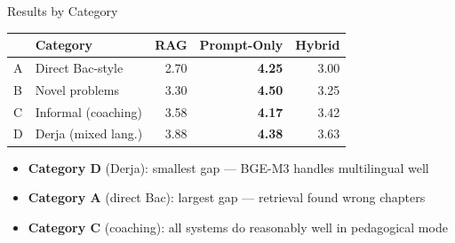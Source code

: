 \documentclass[aspectratio=169, 11pt]{beamer}
\begin{document}
\begin{frame}{Results by Category}

\begin{center}
\begin{tabular}{llrrr}
\toprule
& \textbf{Category} & \textbf{RAG} & \textbf{Prompt-Only} & \textbf{Hybrid} \\
\midrule
A & Direct Bac-style    & 2.70 & \textbf{4.25} & 3.00 \\
B & Novel problems      & 3.30 & \textbf{4.50} & 3.25 \\
C & Informal (coaching) & 3.58 & \textbf{4.17} & 3.42 \\
D & Derja (mixed lang.) & 3.88 & \textbf{4.38} & 3.63 \\
\bottomrule
\end{tabular}
\end{center}

\bigskip

\begin{itemize}
    \item \textbf{Category D} (Derja): smallest gap --- BGE-M3 handles multilingual well
    \item \textbf{Category A} (direct Bac): largest gap --- retrieval found wrong chapters
    \item \textbf{Category C} (coaching): all systems do reasonably well in pedagogical mode
\end{itemize}

\end{frame}
\end{document}
